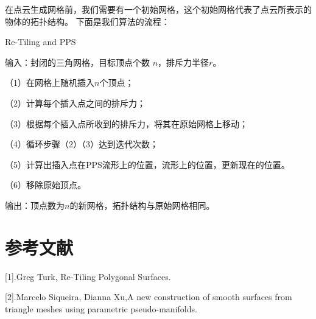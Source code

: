 \documentclass[lang=cn,11pt,a4paper,cite=authoryear]{elegantpaper}
\begin{document}
在点云生成网格前，我们需要有一个初始网格，这个初始网格代表了点云所表示的物体的拓扑结构。
下面是我们算法的流程：

Re-Tiling and PPS

输入：封闭的三角网格，目标顶点个数 $n$，排斥力半径$r$。

（1）在网格上随机插入$n$个顶点；

（2）计算每个插入点之间的排斥力；

（3）根据每个插入点所收到的排斥力，将其在原始网格上移动；

（4）循环步骤（2）（3）达到迭代次数；

（5）计算出插入点在PPS流形上的位置，流形上的位置，更新现在的位置。

（6）移除原始顶点。

输出：顶点数为$n$的新网格，拓扑结构与原始网格相同。


\section{参考文献}
[1].Greg Turk, Re-Tiling Polygonal Surfaces.

[2].Marcelo Siqueira, Dianna Xu,A new construction of smooth surfaces 
from triangle meshes using parametric pseudo-manifolds.
\end{document}
